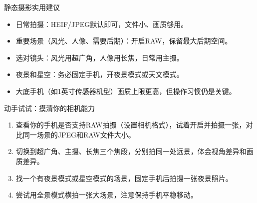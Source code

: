 \begin{tcbinfo}{静态摄影实用建议}
\begin{itemize}
  \item 日常拍摄：HEIF/JPEG默认即可，文件小、画质够用。
  \item 重要场景（风光、人像、需要后期）：开启RAW，保留最大后期空间。
  \item 选对镜头：风光用超广角，人像用长焦，日常用主摄。
  \item 夜景和星空：务必固定手机，开夜景模式或天文模式。
  \item 大底手机（如1英寸传感器机型）画质上限更高，但操作习惯仍是关键。
\end{itemize}

\end{tcbinfo}

\begin{tcbpractice}{动手试试：摸清你的相机能力}
\begin{enumerate}
  \item 查看你的手机是否支持RAW拍摄（设置相机格式），试着开启并拍摄一张，对比同一场景的JPEG和RAW文件大小。
  \item 切换到超广角、主摄、长焦三个焦段，分别拍同一处远景，体会视角差异和画质差异。
  \item 找一个有夜景模式或星空模式的场景，固定手机后拍摄一张夜景照片。
  \item 尝试用全景模式横拍一张大场景，注意保持手机平稳移动。
\end{enumerate}

\end{tcbpractice}
